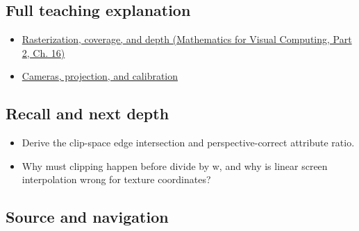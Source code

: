 \subsection{Full teaching explanation}\label{appendix-40426e4b2103-full-teaching-explanation}

\hypertarget{appendix-40426e4b2103-full-teaching-explanation}{}

\begin{itemize}
\tightlist
\item
  \href{../02-Mathematics-for-Visual-Computing-P02/main.pdf\#03-visual-computing-i-ch012-rasterization-coverage-and-depth}{Rasterization, coverage, and depth (Mathematics for Visual Computing, Part 2, Ch. 16)}
\item
  \hyperref[03-visual-computing-i-ch003-cameras-projection-and-calibration]{Cameras, projection, and calibration}
\end{itemize}

\subsection{Recall and next depth}\label{appendix-40426e4b2103-recall-and-next-depth}

\hypertarget{appendix-40426e4b2103-recall-and-next-depth}{}

\begin{itemize}
\tightlist
\item
  Derive the clip-space edge intersection and perspective-correct attribute ratio.
\item
  Why must clipping happen before divide by w, and why is linear screen interpolation wrong for texture coordinates?
\end{itemize}

\subsection{Source and navigation}\label{appendix-40426e4b2103-source-and-navigation}

\hypertarget{appendix-40426e4b2103-source-and-navigation}{}

